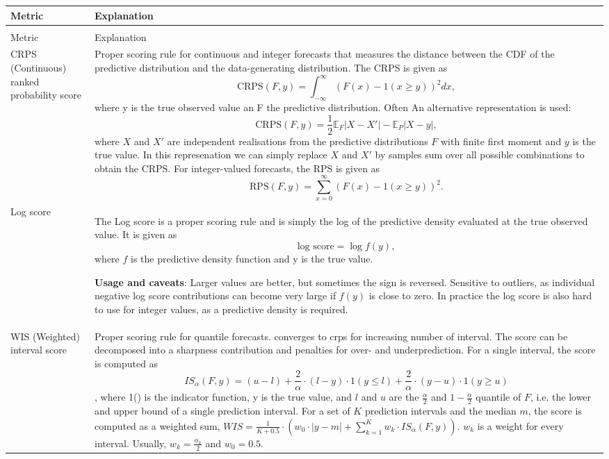 \documentclass{article}
\begin{document}
\begin{landscape}
\begin{longtable}[t]{>{\raggedright\arraybackslash}p{2.5cm}>{\raggedright\arraybackslash}p{16.5cm}}
\toprule
Metric & Explanation\\
\midrule
\endfirsthead
\multicolumn{2}{@{}l}{\textit{(continued)}}\\
\toprule
Metric & Explanation\\
\midrule
\endhead

\endfoot
\bottomrule
\endlastfoot
CRPS (Continuous) ranked probability score & Proper scoring rule for continuous and integer forecasts that measures the distance between the CDF of the predictive distribution and the data-generating distribution. The CRPS is given as 
  $$\text{CRPS}(F, y) = \int_{-\infty}^\infty \left( F(x) - 1(x \geq y) \right)^2 dx,$$
  where y is the true observed value an F the predictive distribution. Often An alternative representation is used:
  $$ \text{CRPS}(F, y) = \frac{1}{2} \mathbb{E}_{F} |X - X'| - \mathbb{E}_P |X - y|,$$ where $X$ and $X'$ are independent realisations from the predictive distributions $F$ with finite first moment and $y$ is the true value. In this represenation we can simply replace $X$ and $X'$ by samples sum over all possible combinations to obtain the CRPS.  For integer-valued forecasts, the RPS is given as 
  $$ \text{RPS}(F, y) = \sum_{x = 0}^\infty (F(x) - 1(x \geq y))^2. $$
  
\cellcolor{gray!6}{  \textbf{Usage}: Proper scoring rule, recommended in most instances, smaller values are better}\\
\addlinespace \addlinespace
Log score & The Log score is a proper scoring rule and is simply the log of the predictive density evaluated at the true observed value. It is given as 
  $$ \text{log score} = \log f(y), $$ where $f$ is the predictive density function and y is the true value.
  
  \textbf{Usage and caveats}: Larger values are better, but sometimes the sign is reversed. Sensitive to outliers, as individual negative log score contributions can become very large if $f(y)$ is close to zero. In practice the log score is also hard to use for integer values, as a predictive density is required.\\
\addlinespace \addlinespace
WIS (Weighted) interval score & Proper scoring rule for quantile forecasts. converges to crps for increasing number of interval. The score can be decomposed into a sharpness contribution and penalties for over- and underprediction. For a single interval, the score is computed as $$IS_\alpha(F,y) = (u-l) + \frac{2}{\alpha} \cdot (l-y) \cdot 1(y \leq l) + \frac{2}{\alpha} \cdot (y-u) \cdot 1(y \geq u)$$, where 1() is the indicator function, y is the true value, and $l$ and $u$ are the $\frac{\alpha}{2}$ and $1 - \frac{\alpha}{2}$ quantile of $F$, i.e. the lower and upper bound of a single prediction interval. For a set of $K$ prediction intervals and the median $m$, the score is computed as a weighted sum, $WIS = \frac{1}{K + 0.5} \cdot (w_0 \cdot |y - m| + \sum_{k = 1}^{K} w_k \cdot IS_{\alpha}(F, y))$. $w_k$ is a weight for every interval. Usually, $w_k = \frac{\alpha_k}{2}$ and $w_0 = 0.5$. 


\end{longtable}
\end{landscape}
\end{document}
